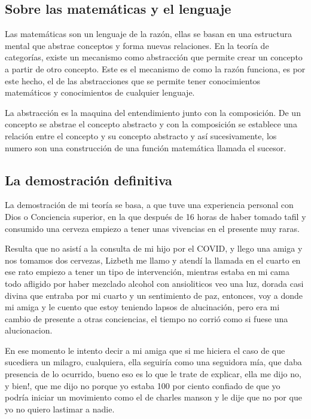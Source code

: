 \documentclass[12pt,letterpaper, a4paper ]{article}
\begin{document}
\subsection{Sobre las matemáticas y el lenguaje}

Las matemáticas son un lenguaje de la razón, ellas se basan en una estructura mental que abstrae conceptos y forma nuevas relaciones. En la teoría de categorías, existe un mecanismo como abstracción que permite crear un concepto a partir de otro concepto. Este es el mecanismo de como la razón funciona, es por este hecho, el de las abstracciones que se permite tener conocimientos matemáticos y conocimientos de cualquier lenguaje.

La abstracción es la maquina del entendimiento junto con la composición. De un concepto se abstrae el concepto abstracto y con la composición se establece una relación entre el concepto y su concepto abstracto y así sucesivamente, los numero son una construcción de una función matemática llamada el sucesor.


\subsection{La demostración definitiva}

La demostración de mi teoría se basa, a que tuve una experiencia personal con Dios o Conciencia superior, en la que después de 16 horas de haber tomado tafil y consumido una cerveza empiezo a tener unas vivencias en el presente muy raras. 

Resulta que no asistí a la consulta de mi hijo por el COVID, y llego una amiga y nos tomamos dos cervezas, Lizbeth me llamo y atendí la llamada en el cuarto en ese rato empiezo a tener un tipo de intervención, mientras estaba en mi cama todo afligido por haber mezclado alcohol con ansioliticos 
veo una luz, dorada casi divina que entraba por mi cuarto y un sentimiento de paz, entonces, voy a donde mi amiga y le cuento que estoy teniendo lapsos de alucinación, pero era mi cambio de presente a otras conciencias, el tiempo no corrió como si fuese una alucionacion.

En ese momento le intento decir a mi amiga que si me hiciera el caso de que sucediera un milagro, cualquiera, ella seguiría como una seguidora mía, que daba presencia de lo ocurrido, bueno eso es lo que le trate de  explicar, ella me dijo no, y bien!, que me dijo no porque yo estaba 100 por ciento confiado de que yo podría iniciar un movimiento como el de charles manson y le dije que no por que yo no quiero lastimar a nadie.
\end{document}
